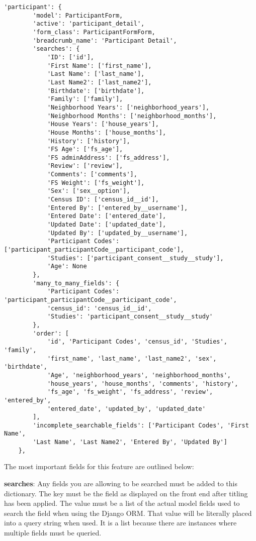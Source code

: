 \documentclass{article}
\begin{document}
\begin{verbatim}
'participant': {
        'model': ParticipantForm,
        'active': 'participant_detail',
        'form_class': ParticipantFormForm,
        'breadcrumb_name': 'Participant Detail',
        'searches': {
            'ID': ['id'],
            'First Name': ['first_name'],
            'Last Name': ['last_name'],
            'Last Name2': ['last_name2'],
            'Birthdate': ['birthdate'],
            'Family': ['family'],
            'Neighborhood Years': ['neighborhood_years'],
            'Neighborhood Months': ['neighborhood_months'],
            'House Years': ['house_years'],
            'House Months': ['house_months'],
            'History': ['history'],
            'FS Age': ['fs_age'],
            'FS adminAddress': ['fs_address'],
            'Review': ['review'],
            'Comments': ['comments'],
            'FS Weight': ['fs_weight'],
            'Sex': ['sex__option'],
            'Census ID': ['census_id__id'],
            'Entered By': ['entered_by__username'],
            'Entered Date': ['entered_date'],
            'Updated Date': ['updated_date'],
            'Updated By': ['updated_by__username'],
            'Participant Codes': ['participant_participantCode__participant_code'],
            'Studies': ['participant_consent__study__study'],
            'Age': None
        },
        'many_to_many_fields': {
            'Participant Codes': 'participant_participantCode__participant_code',
            'census_id': 'census_id__id',
            'Studies': 'participant_consent__study__study'
        },
        'order': [
            'id', 'Participant Codes', 'census_id', 'Studies', 'family', 
            'first_name', 'last_name', 'last_name2', 'sex', 'birthdate', 
            'Age', 'neighborhood_years', 'neighborhood_months', 
            'house_years', 'house_months', 'comments', 'history', 
            'fs_age', 'fs_weight', 'fs_address', 'review', 'entered_by', 
            'entered_date', 'updated_by', 'updated_date'
        ],
        'incomplete_searchable_fields': ['Participant Codes', 'First Name', 
        'Last Name', 'Last Name2', 'Entered By', 'Updated By']
    },
\end{verbatim}
The most important fields for this feature are outlined below:

\textbf{searches}: Any fields you are allowing to be searched must be added to this dictionary. The key must be the field as displayed on the front end after titling has been applied. The value must be a list of the actual model fields used to search the field when using the Django ORM. That value will be literally placed into a query string when used. It is a list because there are instances where multiple fields must be queried.
\end{document}
